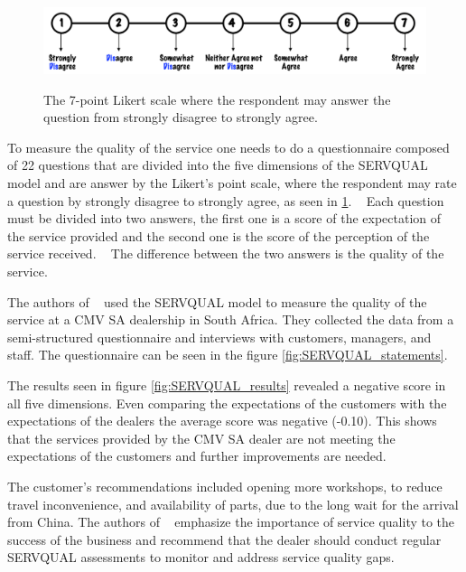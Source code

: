 \begin{figure}[h]
  \caption{The 7-point Likert scale where the respondent may answer the question from strongly disagree to strongly agree. ~\cite{master_servqual_model}}
  \centering
  \includegraphics[width=\textwidth]{figs/likert_scale}
  \label{fig:likert_scale}
\end{figure}


To measure the quality of the service one needs to do a questionnaire composed of 22 questions that are divided into the five dimensions of the SERVQUAL model and are answer by the Likert's point scale, where the respondent may rate a question by strongly disagree to strongly agree, as seen in \ref{fig:likert_scale}. ~\cite{Measuring_After_sales_Service_Quality}
Each question must be divided into two answers, the first one is a score of the expectation of the service provided and the second one is the score of the perception of the service received. ~\cite{Measuring_After_sales_Service_Quality}
The difference between the two answers is the quality of the service. ~\cite{servqual_blog_da_qualidade} ~\cite{Measuring_After_sales_Service_Quality} ~\cite{SERVQUAL_OLD}

The authors of ~\citet{Measuring_After_sales_Service_Quality} used the SERVQUAL model to measure the quality of the service at a CMV SA dealership in South Africa.
They collected the data from a semi-structured questionnaire and interviews with customers, managers, and staff.
The questionnaire can be seen in the figure \ref{fig:SERVQUAL_statements}.

The results seen in figure \ref{fig:SERVQUAL_results} revealed a negative score in all five dimensions. 
Even comparing the expectations of the customers with the expectations of the dealers the average score was negative (-0.10).
This shows that the services provided by the CMV SA dealer are not meeting the expectations of the customers and further improvements are needed. ~\cite{Measuring_After_sales_Service_Quality}

The customer's recommendations included opening more workshops, to reduce travel inconvenience, and availability of parts, due to the long wait for the arrival from China.
The authors of ~\citet{Measuring_After_sales_Service_Quality} emphasize the importance of service quality to the success of the business and recommend that the dealer should conduct regular SERVQUAL assessments to monitor and address service quality gaps. ~\cite{Measuring_After_sales_Service_Quality}

